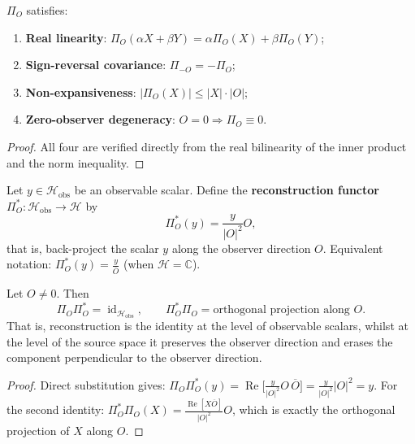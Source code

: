 \begin{proposition}\label{prop:dyn_observer_functor_basic}
$\Pi_O$ satisfies:
\begin{enumerate}[label=(\roman*)]
    \item \textbf{Real linearity}: $\Pi_O(\alpha X+\beta Y)=\alpha\Pi_O(X)+\beta\Pi_O(Y)$;
    \item \textbf{Sign-reversal covariance}: $\Pi_{-O}=-\Pi_O$;
    \item \textbf{Non-expansiveness}: $|\Pi_O(X)|\le|X|\cdot|O|$;
    \item \textbf{Zero-observer degeneracy}: $O=0\Rightarrow\Pi_O\equiv 0$.
\end{enumerate}
\end{proposition}

\begin{proof}
All four are verified directly from the real bilinearity of the inner product and the norm inequality.
\end{proof}

\begin{definition}\label{def:dyn_reconstruction_functor}
Let $y\in\mathcal H_{\text{obs}}$ be an observable scalar. Define the \textbf{reconstruction functor} $\Pi_O^\ast:\mathcal H_{\text{obs}}\to\mathcal H$ by
\[
\Pi_O^\ast(y)=\frac{y}{|O|^2}O,
\]
that is, back-project the scalar $y$ along the observer direction $O$. Equivalent notation: $\Pi_O^\ast(y)=\frac{y}{\overline{O}}$ (when $\mathcal H=\mathbb C$).
\end{definition}

\begin{proposition}\label{prop:dyn_observer_reconstruction_inverse}
Let $O\neq 0$. Then
\[
\Pi_O\Pi_O^\ast=\operatorname{id}_{\mathcal H_{\text{obs}}},\qquad
\Pi_O^\ast\Pi_O=\text{orthogonal projection along }O.
\]
That is, reconstruction is the identity at the level of observable scalars, whilst at the level of the source space it preserves the observer direction and erases the component perpendicular to the observer direction.
\end{proposition}

\begin{proof}
Direct substitution gives: $\Pi_O\Pi_O^\ast(y)=\operatorname{Re}\big[\tfrac{y}{|O|^2}O\,\overline O\big]=\tfrac{y}{|O|^2}|O|^2=y$.
For the second identity: $\Pi_O^\ast\Pi_O(X)=\tfrac{\operatorname{Re}[X\overline O]}{|O|^2}O$, which is exactly the orthogonal projection of $X$ along $O$.
\end{proof}


